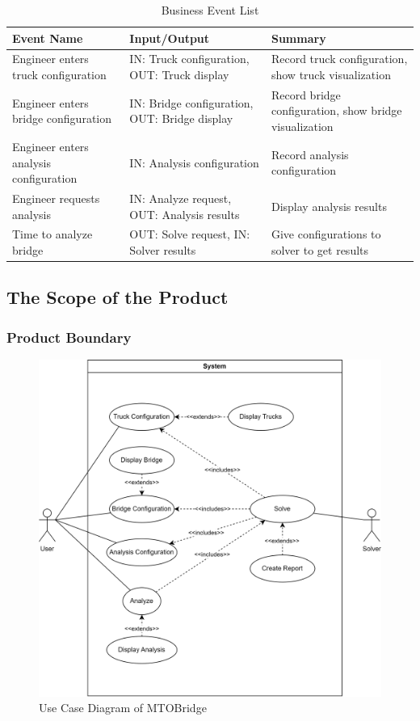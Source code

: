 \documentclass[12pt]{article}
\begin{document}
\begin{table}[hp]
  \caption{Business Event List} \label{TblEventList}
  \begin{tabular}{p{} | p{} | p{}}
  \toprule
  \textbf{Event Name} & \textbf{Input/Output} & \textbf{Summary}\\
  \midrule
  Engineer enters truck configuration & IN: Truck configuration, OUT: Truck display & Record truck configuration, show truck visualization\\
  \midrule
  Engineer enters bridge configuration & IN: Bridge configuration, OUT: Bridge display & Record bridge configuration, show bridge visualization\\
  \midrule
  Engineer enters analysis configuration & IN: Analysis configuration & Record analysis configuration\\
  \midrule
  Engineer requests analysis & IN: Analyze request, OUT: Analysis results & Display analysis results\\
  \midrule
  Time to analyze bridge & OUT: Solve request, IN: Solver results & Give configurations to solver to get results\\
  \bottomrule
\end{tabular}
\end{table}

\subsection{The Scope of the Product}

\subsubsection{Product Boundary}

\begin{figure}[H]
  \includegraphics[width=\columnwidth]{use-case-diagram.png}
  \caption{Use Case Diagram of MTOBridge}
  \label {fig:use-case-diagram}
\end{figure}
\end{document}

